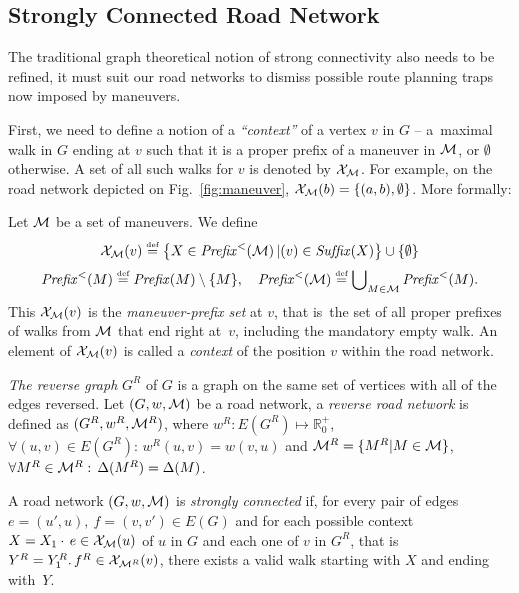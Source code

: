 \documentclass[envcountsect,envcountsame]{llncs}
\begin{document}
\subsection{Strongly Connected Road Network}
\label{sec:connectivity}

The traditional graph theoretical notion of strong connectivity also needs to
be refined, it must suit our road networks to dismiss possible route 
planning traps now imposed by maneuvers. 

First, we need to define a notion of a \emph{``context''} of a vertex $v$ 
in $G$ -- a~maximal walk in $G$ ending at $v$ such that it is a proper 
prefix of a maneuver in $\cal M$, or $\emptyset$ otherwise. A set of all such
walks for $v$ is denoted by ${\cal{X}}_{\cal{M}}$. For example, on the road 
network depicted on Fig.~\ref{fig:maneuver}, 
${\cal{X}}_{\cal M}(b)=\{(a,b),\emptyset\}$. More formally: 

\begin{definition}
  \label{def:context}
  Let $\cal M$ be a set of maneuvers. We define 
  $$ {\cal{X}}_{{\cal{M}}}(v) \stackrel{\textrm{\tiny{def}}}{=} 
  \big\{ X \in \mathit{Prefix}^{<}({\cal M}) \, | (v) \in 
  \mathit{Suf\!fix}(X)\big\} \cup \{\emptyset\} $$
  $$ \mathit{Prefix}^{<}(M) \stackrel{\textrm{\tiny{def}}}{=} \mathit{Prefix}(M)
  \setminus \{M\}, \quad \mathit{Prefix}^{<}({\cal M}) 
  \stackrel{\textrm{\tiny{def}}}{=} \bigcup\nolimits_{M\in 
    \cal M}\mathit{Prefix}^{<}(M). $$
  This ${\cal{X}}_{{\cal{M}}}(v)$ is the {\em maneuver-prefix set} at $v$,
  that is\ the set of all proper prefixes of walks from $\cal M$ that end
  right at~$v$, including the mandatory empty walk.
  An element of ${\cal{X}}_{{\cal{M}}}(v)$ is called a {\em context} of the
  position $v$ within the road network.
\end{definition}


\emph{The reverse graph} $G^R$ of $G$ is a graph on the same set of vertices 
with all of the edges reversed. Let $(G,w,{\cal{M}})$ be a road network, 
a \emph{reverse road network} is defined as $(G^R,w^R,{\cal{M}}^R)$, where 
$w^R: E(G^R) \mapsto \mathbb{R}_0^+$, $\forall (u,v) \in E(G^R):\, w^R(u,v)
= w(v,u)$ and ${\cal{M}}^R = \{ M^R | M \in {\cal{M}}\}$, $\forall M^R \in 
{\cal{M}}^R:\, \Delta(M^R) = \Delta(M)$.

\begin{definition}
  \label{def:Mconnectivity}
  A road network $(G,w,{\cal M})$ is \emph{strongly connected} if, for every 
  pair of edges $e=(u',u),\>f=(v,v') \in E(G)$ and for each possible 
  context $X=X_1\cdot\,e\in{\cal X}_{\cal M}(u)$ of $u$ in $G$ and each one 
  of $v$ in $G^R$, that is \ $Y^R=Y_1^R.\,f^R \in 
  {\cal X}_{{\cal M}^R}(v)$, there exists a valid walk starting with $X$ and 
  ending with~$Y$.
\end{definition}
\end{document}
